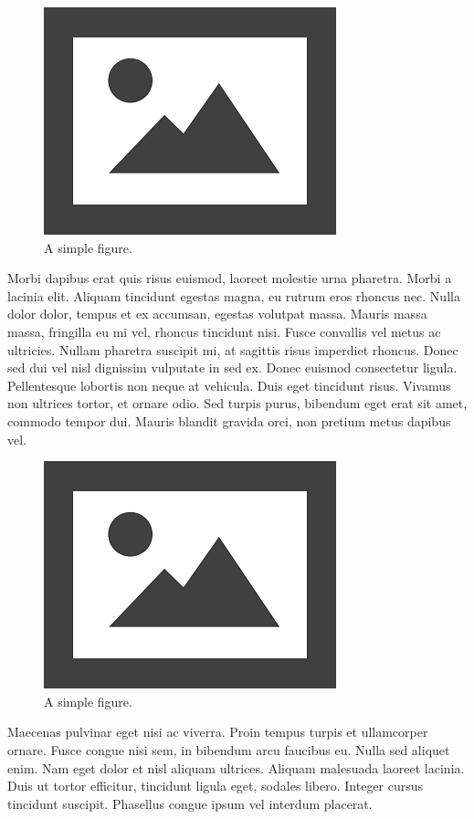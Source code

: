 \documentclass{article}
\begin{document}
	\begin{figure}[H]
		\centering
		\includegraphics[width=0.3\linewidth]{figures/fig2}
		\caption[Figure 2]{A simple figure.}
		\label{fig:fig2}
	\end{figure}

	Morbi dapibus erat quis risus euismod, laoreet molestie urna pharetra. Morbi a lacinia elit. Aliquam tincidunt egestas magna, eu rutrum eros rhoncus nec. Nulla dolor dolor, tempus et ex accumsan, egestas volutpat massa. Mauris massa massa, fringilla eu mi vel, rhoncus tincidunt nisi. Fusce convallis vel metus ac ultricies. Nullam pharetra suscipit mi, at sagittis risus imperdiet rhoncus. Donec sed dui vel nisl dignissim vulputate in sed ex. Donec euismod consectetur ligula. Pellentesque lobortis non neque at vehicula. Duis eget tincidunt risus. Vivamus non ultrices tortor, et ornare odio. Sed turpis purus, bibendum eget erat sit amet, commodo tempor dui. Mauris blandit gravida orci, non pretium metus dapibus vel.
	
	\begin{figure}[H]
		\centering
		\includegraphics[width=0.3\linewidth]{figures/fig3}
		\caption[Figure 3]{A simple figure.}
		\label{fig:fig3}
	\end{figure}

	Maecenas pulvinar eget nisi ac viverra. Proin tempus turpis et ullamcorper ornare. Fusce congue nisi sem, in bibendum arcu faucibus eu. Nulla sed aliquet enim. Nam eget dolor et nisl aliquam ultrices. Aliquam malesuada laoreet lacinia. Duis ut tortor efficitur, tincidunt ligula eget, sodales libero. Integer cursus tincidunt suscipit. Phasellus congue ipsum vel interdum placerat.
\end{document}
